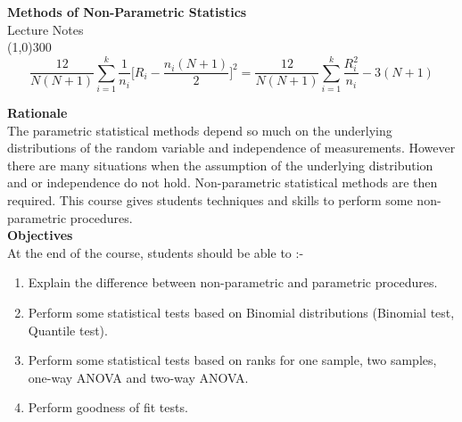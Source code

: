 \documentclass[11pt,a4paper]{article}
\theoremstyle{definition}
\begin{document}
\begin{titlepage}
\begin{center}
\vspace*{3cm}
{\Huge\bfseries Methods of Non-Parametric Statistics}\\[1.2cm]
{\large Lecture Notes}\\[2.5cm]
\line(1,0){300}\\[1.5cm]
$$\frac{12}{N(N+1)}\sum^k_{i=1}\frac{1}{n_i}
\Bigg[R_i-\frac{n_i(N+1)}{2}\Bigg]^2
=\frac{12}{N(N+1)}\sum^k_{i=1}\frac{R^2_{i}}{n_i}-3(N+1)$$
\end{center}
\end{titlepage}

\tableofcontents
\thispagestyle{empty}
\clearpage
\setcounter{page}{1}









\textbf{Rationale}
\hrulefill\\

The parametric statistical methods depend so much on the underlying distributions of the random variable and independence of measurements. However there are many situations when the assumption of the underlying distribution and or independence do not hold. Non-parametric statistical methods are then required. This course gives students techniques and skills to perform some non-parametric procedures.\\








\textbf{Objectives}\\ At the end of the course, students should be able to :-
\begin{enumerate}
\item Explain the difference between non-parametric and parametric procedures.
\item Perform some statistical tests based on Binomial distributions (Binomial test, Quantile test).
\item Perform some statistical tests based on ranks for one sample, two samples, one-way ANOVA and two-way ANOVA.
\item Perform goodness of fit tests.\\
\end{enumerate}
\end{document}
